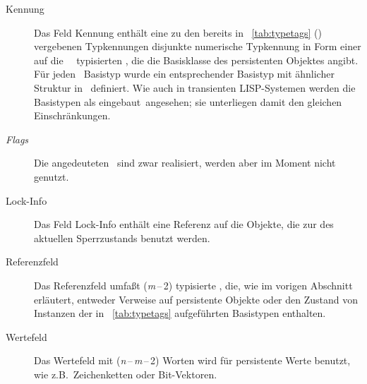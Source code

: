 \begin{description}
%
\item[Kennung]
Das Feld Kennung enth\"{a}lt eine zu den bereits in
\tablename~\ref{tab:typetags} (\citepage{\pageref{tab:typetags}})
vergebenen Typkennungen disjunkte numerische
Typkennung in Form einer auf die \cls\ \ typisierten
\lobjid, die die Basisklasse des persistenten Objektes angibt.
F\"{u}r jeden \cl\ Basistyp wurde ein entsprechender Basistyp mit
\"{a}hn\-li\-cher Struktur in \plob\ definiert. Wie auch in transienten
LISP-Systemen werden die Basistypen als
\rglq{}eingebaut\rgrq\ angesehen; sie unterliegen damit den gleichen
Einschr\"{a}nkungen.
%
\item[{\em Flags}]
Die angedeuteten \ sind zwar
realisiert, werden aber im Moment nicht genutzt.
%
\item[Lock-Info]
Das Feld Lock-Info enth\"{a}lt eine Referenz auf die Objekte, die zur
\representation{} des aktuellen Sperrzustands benutzt werden.
%
\item[Referenzfeld]
Das Referenzfeld umfa\ss{}t ({\it m}\,--\,2) typisierte \lobjid[s], die,
wie im vorigen Abschnitt erl\"{a}utert, entweder Verweise auf persistente
Objekte oder den Zustand von Instanzen der in
\tablename~\ref{tab:typetags} aufgef\"{u}hrten Basistypen enthalten.
%
\item[Wertefeld]
Das Wertefeld mit ({\it n}\,--\,{\it m}\,--\,2) Worten wird f\"{u}r
persistente Werte benutzt, wie z.B.\ Zeichenketten oder Bit-Vektoren.
%
\end{description}
%
